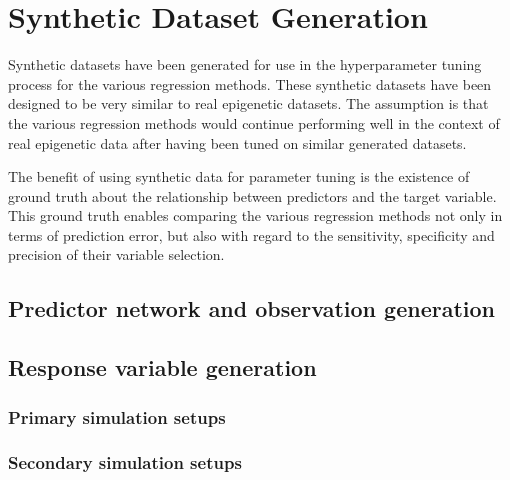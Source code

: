 \chapter{Synthetic Dataset Generation}
Synthetic datasets have been generated for use in the hyperparameter tuning process for the various regression methods. These synthetic datasets have been designed to be very similar to real epigenetic datasets. The assumption is that the various regression methods would continue performing well in the context of real epigenetic data after having been tuned on similar generated datasets.

The benefit of using synthetic data for parameter tuning is the existence of ground truth about the relationship between predictors and the target variable. This ground truth enables comparing the various regression methods not only in terms of prediction error, but also with regard to the sensitivity, specificity and precision of their variable selection.



\section{Predictor network and observation generation}


\section{Response variable generation}

\subsection{Primary simulation setups}

\subsection{Secondary simulation setups}
